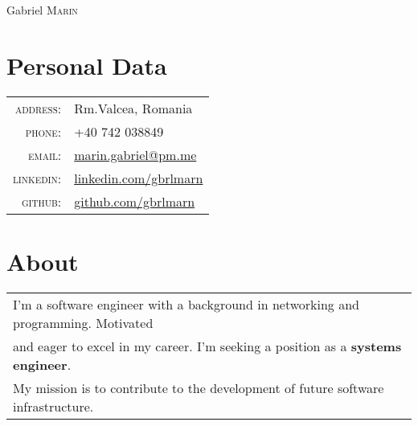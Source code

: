 \documentclass[a4paper,10pt]{article}
\begin{document}
\pagestyle{empty}

\par
  {\centering
    {\Huge Gabriel \textsc{Marin}}
    \bigskip\par
  }

\section{Personal Data}
\begin{tabular}{rl}
  \textsc{address:}&Rm.Valcea, Romania\\
  \textsc{phone:}&+40 742 038849\\
  \textsc{email:}&\href{mailto:marin.gabriel@pm.me}{marin.gabriel@pm.me}\\
  \textsc{linkedin:}&\href{https://linkedin.com/in/gbrlmarn}{linkedin.com/gbrlmarn}\\
  \textsc{github:}&\href{https://github.com/gbrlmarn}{github.com/gbrlmarn}\\
\end{tabular}

\section{About}
\begin{tabular}{l}
I'm a software engineer with a background in networking and programming. Motivated \\
and eager to excel in my career. I'm seeking a position as a \textbf{systems engineer}.\\ 
My mission is to contribute to the development of future software infrastructure.\\
\end{tabular}

\end{document}
